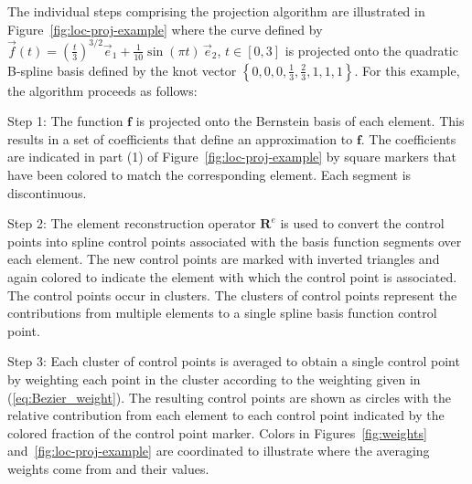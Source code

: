 The individual steps comprising the \Bezier projection algorithm are
illustrated in Figure~\ref{fig:loc-proj-example} where
the curve defined by $\vec{f}(t)=\left( \frac{t}{3}
    \right)^{3/2}\vec{e}_1+\frac{1}{10}\sin (\pi t )\,\vec{e}_2$,
$t\in[0,3]$ is projected onto the quadratic B-spline basis defined by
the knot vector $\left\{0,0,0,\frac{1}{3},\frac{2}{3},1,1,1\right\}$. For this example,
the algorithm proceeds as follows:

\begin{description}

    \item{Step 1:} The function $\mathbf{f}$ is projected onto the Bernstein basis of each element. This results in a set of
          \Bezier coefficients that define an approximation to $\mathbf{f}$.
          The \Bezier coefficients are indicated in part (1) of Figure~\ref{fig:loc-proj-example} by
          square markers that have been colored to match the corresponding
          element. Each \Bezier segment is discontinuous.

    \item{Step 2:} The element reconstruction operator $\mathbf{R}^e$ is used to convert the
          \Bezier control points into spline control points associated with the
          basis function segments over each element.
          The new control points are marked with inverted triangles and
          again colored to indicate the element with which the control point is
          associated. The control points occur in clusters.
          The clusters of control points represent the contributions from
          multiple elements to a single spline basis function control point.

    \item{Step 3:} Each cluster of control points is averaged to obtain a
          single control point by weighting each point in the cluster according
          to the weighting given in (\ref{eq:Bezier_weight}). The resulting control
          points are shown as circles with the relative contribution from each
          element to each control point indicated by the colored fraction of the
          control point marker. Colors in Figures~\ref{fig:weights} and~\ref{fig:loc-proj-example} are coordinated
          to illustrate where the averaging weights come from and their values.
\end{description}

